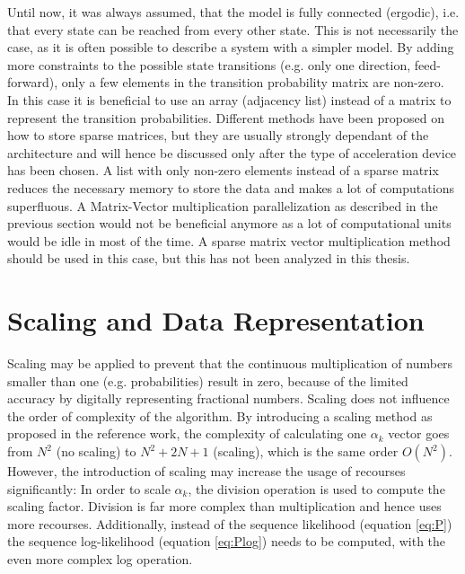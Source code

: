 \documentclass[mscthesis]{usiinfthesis}
\begin{document}
Until now, it was always assumed, that the model is fully connected (ergodic),
i.e. that every state can be reached from every other state. This is not
necessarily the case, as it is often possible to describe a system with
a simpler model. By adding more constraints to the possible state transitions
(e.g. only one direction, feed-forward), only a few elements in the transition
probability matrix are non-zero. In this case it is beneficial to use an array
(adjacency list) instead of a matrix to represent the transition probabilities.
Different methods have been proposed on how to store sparse matrices, but they
are usually strongly dependant of the architecture and will hence be discussed
only after the type of acceleration device has been chosen. A list with only
non-zero elements instead of a sparse matrix reduces the necessary memory to
store the data and makes a lot of computations superfluous. A Matrix-Vector
multiplication parallelization as described in the previous section would not
be beneficial anymore as a lot of computational units would be idle in most of
the time. A sparse matrix vector multiplication method should be used in this
case, but this has not been analyzed in this thesis.

\section{Scaling and Data Representation}
\label{ch:analysis_scaling}

Scaling may be applied to prevent that the continuous multiplication of numbers
smaller than one (e.g. probabilities) result in zero, because of the limited
accuracy by digitally representing fractional numbers. Scaling does not
influence the order of complexity of the algorithm. By introducing a scaling
method as proposed in the reference work, the complexity of calculating one
$\alpha_k$ vector goes from $N^2$ (no scaling) to $N^2 + 2N + 1$ (scaling),
which is the same order $O(N^2)$. However, the introduction of scaling may
increase the usage of recourses significantly: In order to scale $\alpha_k$,
the division operation is used to compute the scaling factor.  Division is far
more complex than multiplication and hence uses more recourses.  Additionally,
instead of the sequence likelihood (equation \ref{eq:P}) the sequence
log-likelihood (equation \ref{eq:Plog}) needs to be computed, with the even
more complex log operation.
\end{document}
